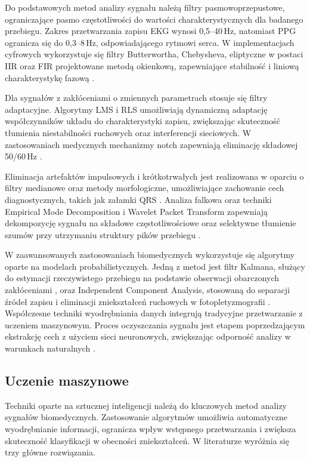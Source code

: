 \documentclass[journal]{IEEEtran}
\begin{document}
Do podstawowych metod analizy sygnału należą filtry pasmowoprzepustowe, ograniczające pasmo częstotliwości do wartości charakterystycznych dla badanego przebiegu. Zakres przetwarzania zapisu EKG wynosi 0,5–40 Hz, natomiast PPG ogranicza się do 0,3–8 Hz, odpowiadającego rytmowi serca. W implementacjach cyfrowych wykorzystuje się filtry Butterwortha, Chebysheva, eliptyczne w postaci IIR oraz FIR projektowane metodą okienkową, zapewniające stabilność i liniową charakterystykę fazową \cite{2}. 

Dla sygnałów z zakłóceniami o zmiennych parametrach stosuje się filtry adaptacyjne. Algorytmy LMS i RLS umożliwiają dynamiczną adaptację współczynników układu do charakterystyki zapisu, zwiększając skuteczność tłumienia niestabilności ruchowych oraz interferencji sieciowych. W zastosowaniach medycznych mechanizmy notch zapewniają eliminację składowej 50/60 Hz \cite{3}.

\newpage
Eliminacja artefaktów impulsowych i krótkotrwałych jest realizowana w oparciu o filtry medianowe oraz metody morfologiczne, umożliwiające zachowanie cech diagnostycznych, takich jak załamki QRS \cite{4}. Analiza falkowa oraz techniki Empirical Mode Decomposition i Wavelet Packet Transform zapewniają dekompozycję sygnału na składowe częstotliwościowe oraz selektywne tłumienie szumów przy utrzymaniu struktury pików przebiegu \cite{5}.

W zaawansowanych zastosowaniach biomedycznych wykorzystuje się algorytmy oparte na modelach probabilistycznych. Jedną z metod jest filtr Kalmana, służący do estymacji rzeczywistego przebiegu na podstawie obserwacji obarczonych zakłóceniami \cite{6}, oraz Independent Component Analysis, stosowaną do separacji źródeł zapisu i eliminacji zniekształceń ruchowych w fotopletyzmografii \cite{7}. Współczesne techniki wyodrębniania danych integrują tradycyjne przetwarzanie z uczeniem maszynowym. Proces oczyszczania sygnału jest etapem poprzedzającym ekstrakcję cech z użyciem sieci neuronowych, zwiększając odporność analizy w warunkach naturalnych \cite{8}.

\subsection{Uczenie maszynowe}
Techniki oparte na sztucznej inteligencji należą do kluczowych metod analizy sygnałów biomedycznych. Zastosowanie algorytmów umożliwia automatyczne wyodrębnianie informacji, ogranicza wpływ wstępnego przetwarzania i zwiększa skuteczność klasyfikacji w obecności zniekształceń. W literaturze wyróżnia się trzy główne rozwiązania.
\end{document}
